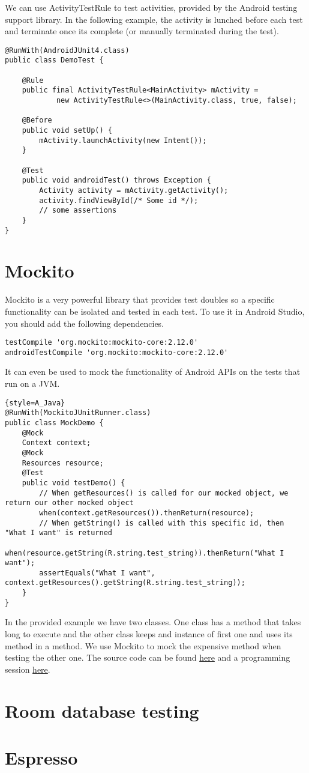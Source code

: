We can use ActivityTestRule to test activities, provided by the Android testing support library. In the following example, the activity is lunched before each test and terminate once its complete (or manually terminated during the test).
\begin{lstlisting}[style=A_Java]
@RunWith(AndroidJUnit4.class)
public class DemoTest {
    
    @Rule
    public final ActivityTestRule<MainActivity> mActivity =
            new ActivityTestRule<>(MainActivity.class, true, false);

    @Before
    public void setUp() {
        mActivity.launchActivity(new Intent());
    }
    
    @Test
    public void androidTest() throws Exception {
        Activity activity = mActivity.getActivity();
        activity.findViewById(/* Some id */);
        // some assertions
    }
}
\end{lstlisting}

\section{Mockito}
Mockito is a very powerful library that provides test doubles so a specific functionality can be isolated and tested in each test. To use it in Android Studio, you should add the following dependencies.
\begin{lstlisting}[style=A_txt]
testCompile 'org.mockito:mockito-core:2.12.0'
androidTestCompile 'org.mockito:mockito-core:2.12.0'
\end{lstlisting}
It can even be used to mock the functionality of Android APIs on the tests that run on a JVM.
\begin{lstlisting}{style=A_Java}
@RunWith(MockitoJUnitRunner.class)
public class MockDemo {
    @Mock
    Context context;
    @Mock
    Resources resource;
    @Test
    public void testDemo() {
        // When getResources() is called for our mocked object, we return our other mocked object
        when(context.getResources()).thenReturn(resource);
        // When getString() is called with this specific id, then "What I want" is returned
        when(resource.getString(R.string.test_string)).thenReturn("What I want");
        assertEquals("What I want", context.getResources().getString(R.string.test_string));
    }
}
\end{lstlisting}
In the provided example we have two classes. One class has a method that takes long to execute and the other class keeps and instance of first one and uses its method in a method. We use Mockito to mock the expensive method when testing the other one. The source code can be found \href{TODO}{here} and a programming session \href{TODO}{here}.

\section{Room database testing}


\section{Espresso}

